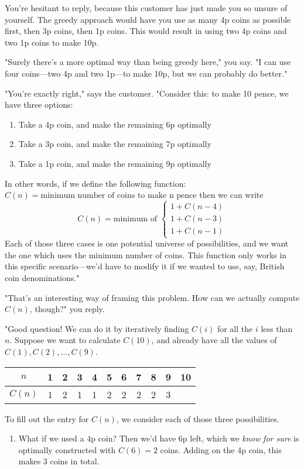 \documentclass{article}
\begin{document}
\begin{multicols}{3}
You're hesitant to reply, because this customer has just made you so unsure of yourself. The greedy approach would have you use as many 4p coins as possible first, then 3p coins, then 1p coins. This would result in using two 4p coins and two 1p coins to make 10p.

"Surely there's a more optimal way than being greedy here," you say. "I can use four coins—two 4p and two 1p—to make 10p, but we can probably do better."

"You're exactly right," says the customer. "Consider this: to make 10 pence, we have three options:
\begin{enumerate}
\item Take a 4p coin, and make the remaining 6p optimally
\item Take a 3p coin, and make the remaining 7p optimally
\item Take a 1p coin, and make the remaining 9p optimally
\end{enumerate}
In other words, if we define the following function:
$C(n) = \text{minimum number of coins to make n pence}$
then we can write
\[
C(n) = \text{minimum of }
\begin{cases}
    1 + C(n - 4) \\
    1 + C(n - 3) \\
    1 + C(n - 1)
\end{cases}
\]
Each of those three cases is one potential universe of possibilities, and we want the one which uses the minimum number of coins. This function only works in this specific scenario—we'd have to modify it if we wanted to use, say, British coin denominations."

"That's an interesting way of framing this problem. How can we actually compute $C(n)$, though?" you reply.

"Good question! We can do it by iteratively finding $C(i)$ for all the $i$ less than $n$. Suppose we want to calculate $C(10)$, and already have all the values of $C(1), C(2), \dots, C(9)$.

\begin{table}[h]
    \centering
    \begin{tabular}{c|c|c|c|c|c|c|c|c|c|c}
        $n$ & 1 & 2 & 3 & 4 & 5 & 6 & 7 & 8 & 9 & 10 \\\hline
        $C(n)$ & 1 & 2 & 1 & 1 & 2 & 2 & 2 & 2 & 3 & 
    \end{tabular}
\end{table}
To fill out the entry for $C(n)$, we consider each of those three possibilities.
\begin{enumerate}
    \item What if we used a 4p coin? Then we'd have 6p left, which we \textit{know for sure} is optimally constructed with $C(6) = 2$ coins. Adding on the 4p coin, this makes 3 coins in total.


\end{enumerate}
\end{multicols}
\end{document}
